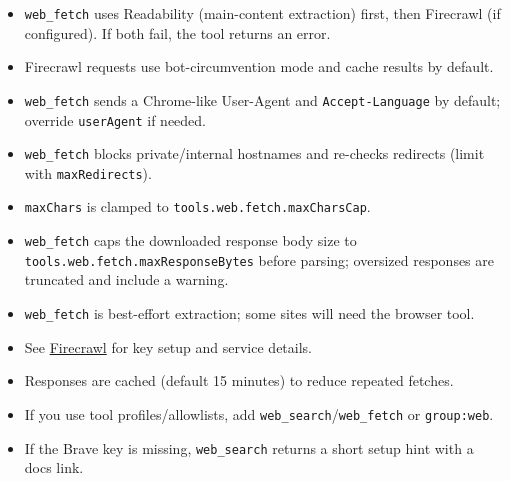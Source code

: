\begin{itemize}
  \item \texttt{web\_fetch} uses Readability (main-content extraction) first, then Firecrawl (if configured). If both fail, the tool returns an error.
  \item Firecrawl requests use bot-circumvention mode and cache results by default.
  \item \texttt{web\_fetch} sends a Chrome-like User-Agent and \texttt{Accept-Language} by default; override \texttt{userAgent} if needed.
  \item \texttt{web\_fetch} blocks private/internal hostnames and re-checks redirects (limit with \texttt{maxRedirects}).
  \item \texttt{maxChars} is clamped to \texttt{tools.web.fetch.maxCharsCap}.
  \item \texttt{web\_fetch} caps the downloaded response body size to \texttt{tools.web.fetch.maxResponseBytes} before parsing; oversized responses are truncated and include a warning.
  \item \texttt{web\_fetch} is best-effort extraction; some sites will need the browser tool.
  \item See \href{/tools/firecrawl}{Firecrawl} for key setup and service details.
  \item Responses are cached (default 15 minutes) to reduce repeated fetches.
  \item If you use tool profiles/allowlists, add \texttt{web\_search}/\texttt{web\_fetch} or \texttt{group:web}.
  \item If the Brave key is missing, \texttt{web\_search} returns a short setup hint with a docs link.
\end{itemize}



\clearpage
